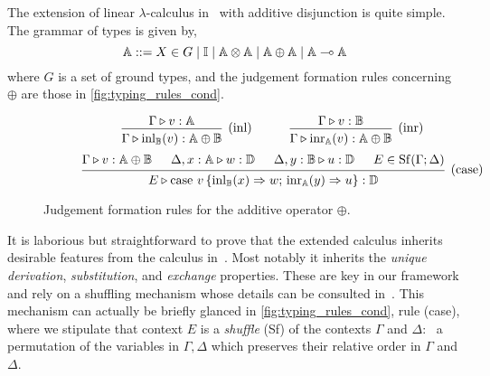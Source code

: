 \documentclass[a4paper,UKenglish,cleveref, autoref, thm-restate]{lipics-v2021}
\begin{document}
The extension of linear $\lambda$-calculus
in~\cite{dahlqvist22,dahlqvist2023syntactic} with additive disjunction is quite
simple. The grammar of types is given by,
\begin{equation*} \label{eq:grammartypes}
   \mathbb{A} ::= X \in G \mid \mathbb{I} \mid \mathbb{A}  \otimes \mathbb{A} \mid \mathbb{A}
   \oplus \mathbb{A} \mid \mathbb{A} \multimap  \mathbb{A}
\end{equation*}
where $G$ is a set of ground types, and the judgement formation rules
concerning $\oplus$ are those in \autoref{fig:typing_rules_cond}. 
\begin{figure}[H]
    \begin{equation*}
            \hspace{60pt}
    \begin{prooftree}
        \hypo{\Gamma \vljud v: \typeA}
        \infer1[(inl)]{\Gamma \vljud \inl_{\typeB}(v): \typeA \oplus \typeB}
    \end{prooftree}
    \hspace{30pt}
    \begin{prooftree}
        \hypo{\Gamma \vljud v: \typeB}
        \infer1[(inr)]{\Gamma \vljud \inr_{\typeA}(v): \typeA \oplus \typeB}
    \end{prooftree} 
    \end{equation*}
    \begin{equation*}
            \hspace{30pt}
    \begin{prooftree}
        \hypo{\Gamma \vljud v: \typeA \oplus \typeB}
        \hypo{\Delta, x: \typeA \vljud w: \typeD}
        \hypo{\Delta, y: \typeB \vljud u: \typeD}
        \hypo{E \in \Shuff(\Gamma; \Delta)}
        \infer4[(case)]{E \vljud \text{case } v\,
        \{\inl_{\typeB}(x) 
            \Rightarrow w ; \,
          \inr_{\typeA}(y) \Rightarrow u
        \}: \typeD}
    \end{prooftree}
    \end{equation*}
    \caption{Judgement formation rules for the additive operator $\oplus$.}
    \label{fig:typing_rules_cond}
\end{figure}
It is laborious but straightforward to prove that the extended calculus
inherits desirable features from the calculus
in~\cite{dahlqvist22,dahlqvist2023syntactic}. Most notably it inherits the
\emph{unique derivation}, \emph{substitution}, and \emph{exchange} properties.
These are key in our framework and rely on a shuffling mechanism whose details
can be consulted in~\cite{dahlqvist22,dahlqvist2023syntactic,shulman19}. This
mechanism can actually be briefly glanced in \autoref{fig:typing_rules_cond},
rule (case), where we stipulate that context $E$ is a \emph{shuffle} (Sf) of
the contexts $\Gamma$ and $\Delta$: \ie\ a permutation of the variables in
$\Gamma,\Delta$ which preserves their relative order in $\Gamma$ and $\Delta$.
\end{document}
